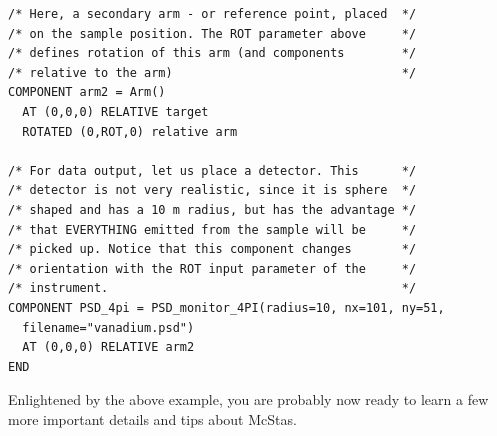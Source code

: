 \begin{verbatim}
/* Here, a secondary arm - or reference point, placed  */
/* on the sample position. The ROT parameter above     */
/* defines rotation of this arm (and components        */
/* relative to the arm)                                */
COMPONENT arm2 = Arm() 
  AT (0,0,0) RELATIVE target
  ROTATED (0,ROT,0) relative arm

/* For data output, let us place a detector. This      */
/* detector is not very realistic, since it is sphere  */
/* shaped and has a 10 m radius, but has the advantage */
/* that EVERYTHING emitted from the sample will be     */
/* picked up. Notice that this component changes       */
/* orientation with the ROT input parameter of the     */
/* instrument.                                         */
COMPONENT PSD_4pi = PSD_monitor_4PI(radius=10, nx=101, ny=51,
  filename="vanadium.psd")
  AT (0,0,0) RELATIVE arm2
END
\end{verbatim}
Enlightened by the above example, you are probably now ready to learn
a few more important details and tips about McStas.

